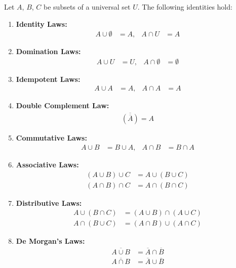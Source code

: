 \documentclass[11pt,a4paper]{article}
\begin{document}
Let $A$, $B$, $C$ be subsets of a universal set $U$. The following identities hold:

\begin{enumerate}[label=\textbf{\arabic*.}, leftmargin=*]
    \item \textbf{Identity Laws:}
    \begin{align*}
        A \cup \emptyset &= A, & A \cap U &= A
    \end{align*}
    
    \item \textbf{Domination Laws:}
    \begin{align*}
        A \cup U &= U, & A \cap \emptyset &= \emptyset
    \end{align*}
    
    \item \textbf{Idempotent Laws:}
    \begin{align*}
        A \cup A &= A, & A \cap A &= A
    \end{align*}
    
    \item \textbf{Double Complement Law:}
    \begin{align*}
        \overline{(\overline{A})} = A
    \end{align*}
    
    \item \textbf{Commutative Laws:}
    \begin{align*}
        A \cup B &= B \cup A, & A \cap B &= B \cap A
    \end{align*}
    
    \item \textbf{Associative Laws:}
    \begin{align*}
        (A \cup B) \cup C &= A \cup (B \cup C) \\
        (A \cap B) \cap C &= A \cap (B \cap C)
    \end{align*}
    
    \item \textbf{Distributive Laws:}
    \begin{align*}
        A \cup (B \cap C) &= (A \cup B) \cap (A \cup C) \\
        A \cap (B \cup C) &= (A \cap B) \cup (A \cap C)
    \end{align*}
    
    \item \textbf{De Morgan's Laws:}
    \begin{align*}
        \overline{A \cup B} &= \overline{A} \cap \overline{B} \\
        \overline{A \cap B} &= \overline{A} \cup \overline{B}
    \end{align*}
    

\end{enumerate}
\end{document}
